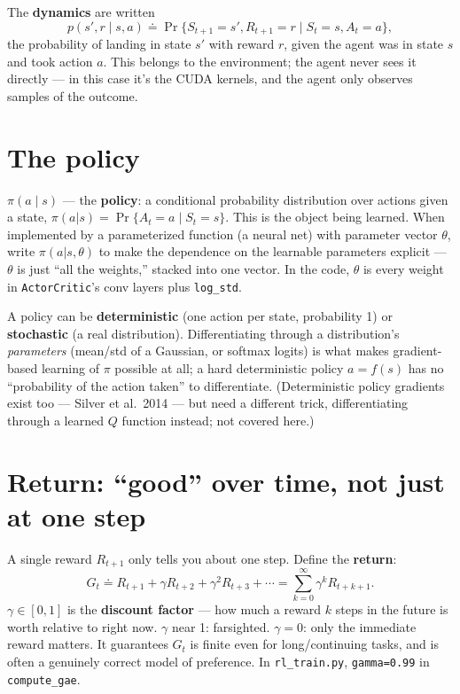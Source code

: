 \documentclass[11pt]{article}
\begin{document}
The \textbf{dynamics} are written
$$p(s', r \mid s, a) \doteq \Pr\{S_{t+1}=s', R_{t+1}=r \mid S_t=s, A_t=a\},$$
the probability of landing in state $s'$ with reward $r$, given the agent was in state $s$
and took action $a$. This belongs to the environment; the agent never sees it directly ---
in this case it's the CUDA kernels, and the agent only observes samples of the outcome.

\section*{The policy}

$\pi(a \mid s)$ --- the \textbf{policy}: a conditional probability distribution over
actions given a state, $\pi(a|s) = \Pr\{A_t = a \mid S_t = s\}$. This is the object being
learned. When implemented by a parameterized function (a neural net) with parameter vector
$\theta$, write $\pi(a|s,\theta)$ to make the dependence on the learnable parameters
explicit --- $\theta$ is just ``all the weights,'' stacked into one vector. In the code,
$\theta$ is every weight in \texttt{ActorCritic}'s conv layers plus \texttt{log\_std}.

A policy can be \textbf{deterministic} (one action per state, probability 1) or
\textbf{stochastic} (a real distribution). Differentiating through a distribution's
\emph{parameters} (mean/std of a Gaussian, or softmax logits) is what makes gradient-based
learning of $\pi$ possible at all; a hard deterministic policy $a=f(s)$ has no
``probability of the action taken'' to differentiate. (Deterministic policy gradients
exist too --- Silver et al.\ 2014 --- but need a different trick, differentiating through
a learned $Q$ function instead; not covered here.)

\section*{Return: ``good'' over time, not just at one step}

A single reward $R_{t+1}$ only tells you about one step. Define the \textbf{return}:
$$G_t \doteq R_{t+1} + \gamma R_{t+2} + \gamma^2 R_{t+3} + \cdots = \sum_{k=0}^\infty \gamma^k R_{t+k+1}.$$
$\gamma \in [0,1]$ is the \textbf{discount factor} --- how much a reward $k$ steps in the
future is worth relative to right now. $\gamma$ near 1: farsighted. $\gamma=0$: only the
immediate reward matters. It guarantees $G_t$ is finite even for long/continuing tasks,
and is often a genuinely correct model of preference. In \texttt{rl\_train.py},
\texttt{gamma=0.99} in \texttt{compute\_gae}.
\end{document}
